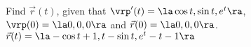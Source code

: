 {Find $\vec r(t)$, given that $\vrp'(t) = \la \cos t,\sin t,e^t\ra$,\\  $\vrp(0) = \la 0,0,0\ra$ and $\vec r(0) = \la 0,0,0\ra$.
}
{
$\vec r(t) = \la-\cos t+1,t-\sin t,e^t-t-1 \ra$
}

